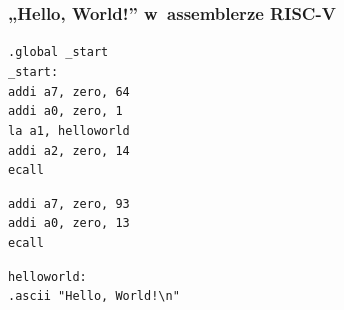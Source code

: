 \documentclass[10pt,t]{beamer}
\begin{document}
\begin{frame}
  \frametitle{„Hello, World!” w~assemblerze RISC-V
    \parencite{Low-Level-You-Can-Learn-RISC-V-ETC-Ver-2021}}


  \texttt{.global \_start} \\
  \texttt{\_start:} \\
  \hphantom{aaaa} \texttt{addi a7, zero, 64} \\
  \hphantom{aaaa} \texttt{addi a0, zero, 1} \\
  \hphantom{aaaa} \texttt{la a1, helloworld} \\
  \hphantom{aaaa} \texttt{addi a2, zero, 14} \\
  \hphantom{aaaa} \texttt{ecall}
  \vspace{0.8em}

  \hphantom{aaaa} \texttt{addi a7, zero, 93} \\
  \hphantom{aaaa} \texttt{addi a0, zero, 13} \\
  \hphantom{aaaa} \texttt{ecall}
  \vspace{0.8em}

  \texttt{helloworld:} \\
  \hphantom{aaaa} \texttt{.ascii "Hello, World!\textbackslash n"}

\end{frame}
\end{document}
